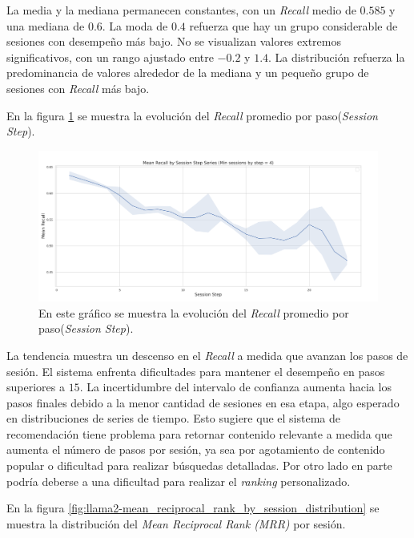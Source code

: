 \documentclass[11pt,a4paper,twoside]{thesis}
\begin{document}
La media y la mediana permanecen constantes, con un \textit{Recall} medio de $0.585$ y una mediana de $0.6$. La moda de $0.4$ refuerza que hay un grupo considerable de sesiones con desempeño más bajo. No se visualizan valores extremos significativos, con un rango ajustado entre $-0.2$ y $1.4$. La distribución refuerza la predominancia de valores alrededor de la mediana y un pequeño grupo de sesiones con \textit{Recall} más bajo.

En la figura \ref{fig:llama2-mean_recall_by_session_step_series} se muestra la evolución del \textit{Recall} promedio por paso(\textit{Session Step}).


\begin{figure}[htbp]
	\centering
	\includegraphics[width=15cm]{./images/llama2/mean_recall_by_session_step_series.png}
	\caption{En este gráfico se muestra la evolución del \textit{Recall} promedio por paso(\textit{Session Step}).}
	\label{fig:llama2-mean_recall_by_session_step_series}
\end{figure}

La tendencia muestra un descenso en el \textit{Recall} a medida que avanzan los pasos de sesión. El sistema enfrenta dificultades para mantener el desempeño en pasos superiores a $15$.
La incertidumbre del intervalo de confianza aumenta hacia los pasos finales debido a la menor cantidad de sesiones en esa etapa, algo esperado en distribuciones de series de tiempo. Esto sugiere que el sistema de recomendación tiene problema para retornar contenido relevante a medida que aumenta el número de pasos por sesión, ya sea por agotamiento de contenido popular o dificultad para realizar búsquedas detalladas. Por otro lado en parte podría deberse a una dificultad para realizar el \textit{ranking} personalizado.

En la figura \ref{fig:llama2-mean_reciprocal_rank_by_session_distribution} se muestra la distribución del \textit{Mean Reciprocal Rank (MRR)} por sesión.
\end{document}
